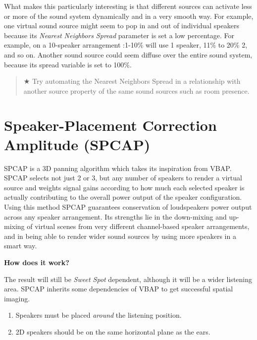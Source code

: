 \documentclass[
  letterpaper,
  DIV=11,
  numbers=noendperiod]{scrreport}
\providecommand{\tightlist}{%
  \setlength{\itemsep}{0pt}\setlength{\parskip}{0pt}}\usepackage{longtable,booktabs,array}
\begin{document}
What makes this particularly interesting is that different sources can
activate less or more of the sound system dynamically and in a very
smooth way. For example, one virtual sound source might seem to pop in
and out of individual speakers because its \emph{Nearest Neighbors
Spread} parameter is set a low percentage. For example, on a 10-speaker
arrangement :1-10\% will use 1 speaker, 11\% to 20\% 2, and so on.
Another sound source could seem diffuse over the entire sound system,
because its spread variable is set to 100\%.

\begin{quote}
★ Try automating the Nearest Neighbors Spread in a relationship with
another source property of the same sound sources such as room presence.
\end{quote}

\hypertarget{speaker-placement-correction-amplitude-spcap}{%
\section{Speaker-Placement Correction Amplitude
(SPCAP)}\label{speaker-placement-correction-amplitude-spcap}}

SPCAP is a 3D panning algorithm which takes its inspiration from VBAP.
SPCAP selects not just 2 or 3, but any number of speakers to render a
virtual source and weights signal gains according to how much each
selected speaker is actually contributing to the overall power output of
the speaker configuration. Using this method SPCAP guarantees
conservation of loudspeakers power output across any speaker
arrangement. Its strengths lie in the down-mixing and up-mixing of
virtual scenes from very different channel-based speaker arrangements,
and in being able to render wider sound sources by using more speakers
in a smart way.

\textbf{How does it work?}

The result will still be \emph{Sweet Spot} dependent, although it will
be a wider listening area. SPCAP inherits some dependencies of VBAP to
get successful spatial imaging.

\begin{enumerate}
\def\labelenumi{\arabic{enumi}.}
\tightlist
\item
  Speakers must be placed \emph{around} the listening position.
\item
  2D speakers should be on the same horizontal plane as the ears.
\end{enumerate}
\end{document}
